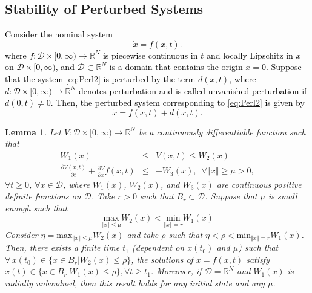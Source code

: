 \documentclass[letterpaper, 10 pt, conference]{ieeeconf}  %
\newtheorem{lemma}[theorem]{Lemma}
\begin{document}
{\subsection{Stability of Perturbed Systems}

\textcolor{black}{Consider the nominal system
	\begin{equation}
	\dot{x}=f(x,t).\label{eq:Perl2}
	\end{equation}
	where $f:\mathcal{{D}}\times[0,\infty)\rightarrow\mathbb{R}^{N}$
	is piecewise continuous in $t$ and locally Lipschitz in $x$ on $\mathcal{{D}}\times[0,\infty)$,
	and $\mathcal{{D}}\subset\mathbb{R}^{N}$ is a domain that contains
	the origin $x=0$. Suppose that the system \eqref{eq:Perl2} is perturbed
	by the term $d(x,t)$, where $d:\mathcal{D}\times[0,\infty)\rightarrow\mathbb{R}^{N}$
	denotes perturbation and is called unvanished perturbation if $d(0,t)\neq0$.
	Then, the perturbed system corresponding to \eqref{eq:Perl2} is given
	by
	\begin{equation}
	\dot{x}=f(x,t)+d(x,t).\label{eq:Prel1}
	\end{equation}
}
\begin{lemma}
	\label{lem:stability}\cite[Theorem 5.1]{khalil1996nonlinear} Let
	$V:\mathcal{D}\times[0,\infty)\rightarrow\mathbb{R}^{N}$ be a continuously
	differentiable function such that
	\begin{eqnarray*}
		W_{1}(x) & \leq & V(x,t)\leq W_{2}(x)\\
		\frac{\partial V(x,t)}{\partial t}+\frac{\partial V}{\partial x}f(x,t) & \leq & -W_{3}(x),\,\,\,\forall\left\Vert x\right\Vert \geq\mu>0,
	\end{eqnarray*}
	$\forall t\geq0$, $\forall x\in\mathcal{D}$, where $W_{1}(x)$,
	$W_{2}(x)$, and $W_{3}(x)$ are continuous positive definite functions
	on $\mathcal{D}$. Take $r>0$ such that $B_{r}\subset\mathcal{D}$.
	Suppose that $\mu$ is small enough such that
	\[
	\underset{\left\Vert x\right\Vert \leq\mu}{\text{{max}}}W_{2}(x)<\underset{\left\Vert x\right\Vert =r}{\text{{min}}}W_{1}(x)
	\]
	Consider $\eta=\text{{max}}_{\left\Vert x\right\Vert \leq\mu}W_{2}(x)$
	and take $\rho$ such that $\eta<\rho<\text{{min}}_{\left\Vert x\right\Vert =r}W_{1}(x)$.
	Then, there exists a finite time $t_{1}$ (dependent on $x(t_{0})$
	and $\mu$) such that $\forall\,x(t_{0})\in\{x\in B_{r}|W_{2}(x)\leq\rho\}$,
	the solutions of $\dot{x}=f(x,t)$ satisfy $x(t)\in\{x\in B_{r}|W_{1}(x)\leq\rho\},\forall t\geq t_{1}$.
	Moreover, if $\mathcal{D}=\mathbb{{R}}^{N}$ and $W_{1}(x)$ is radially
	unboudned, then this result holds for any initial state and any $\mu$.
\end{lemma}

}
\end{document}

